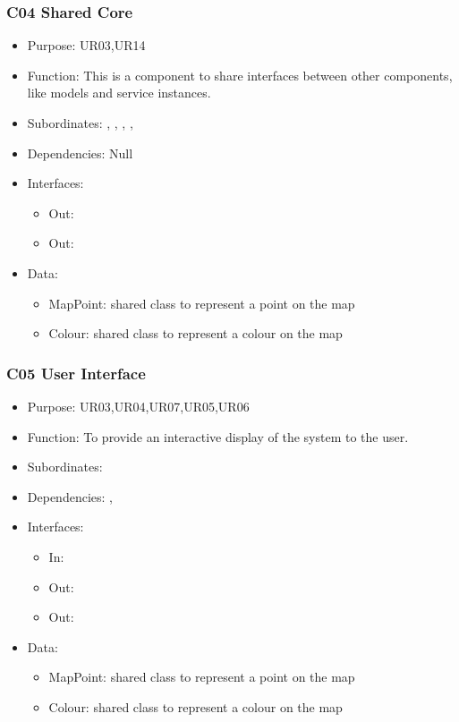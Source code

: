\subsubsection{C04 Shared Core} \label{compShared}
\begin{itemize}
	\item Purpose: UR03,UR14
	\item Function: This is a component to share interfaces between other components, like models and service instances.
	\item Subordinates: , , , , 
	\item Dependencies: Null
	\item Interfaces:
	\begin{itemize}
		\item Out: \texttt{}
		\item Out: \texttt{}
	\end{itemize}
	\item Data:
	\begin{itemize}
		\item MapPoint: shared class to represent a point on the map
		\item Colour: shared class to represent a colour on the map
	\end{itemize}
\end{itemize}

\subsubsection{C05 User Interface} \label{compUI}
\begin{itemize}
	\item Purpose: UR03,UR04,UR07,UR05,UR06
	\item Function: To provide an interactive display of the system to the user. 
	\item Subordinates: 
	\item Dependencies: , 
	\item Interfaces:
	\begin{itemize}
		\item In: \texttt{}
		\item Out: \texttt{}
		\item Out: \texttt{}
	\end{itemize}
	\item Data:
	\begin{itemize}
		\item MapPoint: shared class to represent a point on the map
		\item Colour: shared class to represent a colour on the map
	\end{itemize}
\end{itemize}

